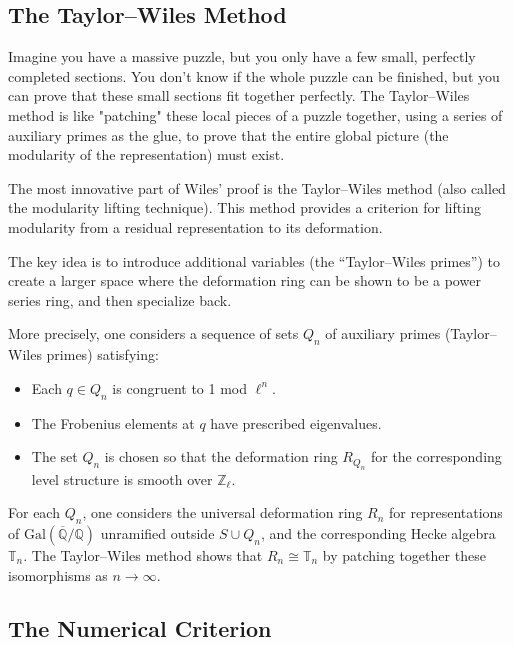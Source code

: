 \subsection{The Taylor--Wiles Method}

\begin{analogy}
Imagine you have a massive puzzle, but you only have a few small, perfectly completed sections. You don't know if the whole puzzle can be finished, but you can prove that these small sections fit together perfectly. The Taylor--Wiles method is like "patching" these local pieces of a puzzle together, using a series of auxiliary primes as the glue, to prove that the entire global picture (the modularity of the representation) must exist.
\end{analogy}

The most innovative part of Wiles' proof is the Taylor--Wiles method (also called the modularity lifting technique). This method provides a criterion for lifting modularity from a residual representation to its deformation.


The key idea is to introduce additional variables (the ``Taylor--Wiles primes'') to create a larger space where the deformation ring can be shown to be a power series ring, and then specialize back.

More precisely, one considers a sequence of sets $Q_n$ of auxiliary primes (Taylor--Wiles primes) satisfying:
\begin{itemize}
\item Each $q \in Q_n$ is congruent to 1 mod $\ell^n$.
\item The Frobenius elements at $q$ have prescribed eigenvalues.
\item The set $Q_n$ is chosen so that the deformation ring $R_{Q_n}$ for the corresponding level structure is smooth over $\mathbb{Z}_\ell$.
\end{itemize}

For each $Q_n$, one considers the universal deformation ring $R_n$ for representations of $\mathrm{Gal}(\overline{\mathbb{Q}}/\mathbb{Q})$ unramified outside $S \cup Q_n$, and the corresponding Hecke algebra $\mathbb{T}_n$. The Taylor--Wiles method shows that $R_n \cong \mathbb{T}_n$ by patching together these isomorphisms as $n \to \infty$.

\subsection{The Numerical Criterion}

